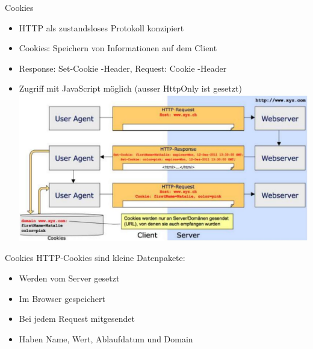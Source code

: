 \begin{definition}{Cookies}

\begin{itemize}
\item HTTP als zustandsloses Protokoll konzipiert
\item Cookies: Speichern von Informationen auf dem Client
\item Response: Set-Cookie -Header, Request: Cookie -Header
\item Zugriff mit JavaScript möglich (ausser HttpOnly ist gesetzt)\\
\includegraphics[width=\linewidth]{images/2024_12_29_858f09cde51177c71657g-31}
\end{itemize}
\end{definition}

\begin{definition}{Cookies}
    HTTP-Cookies sind kleine Datenpakete:
    \begin{itemize}
        \item Werden vom Server gesetzt
        \item Im Browser gespeichert
        \item Bei jedem Request mitgesendet
        \item Haben Name, Wert, Ablaufdatum und Domain
    \end{itemize}
\end{definition}


